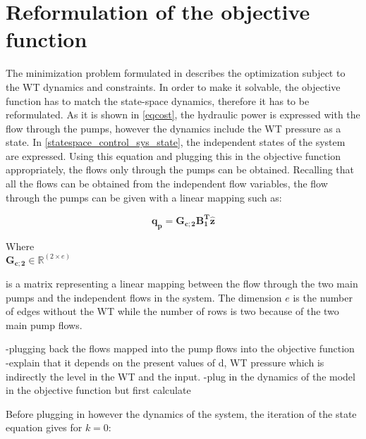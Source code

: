 \section{Reformulation of the objective function}
\label{ObjFunc_reform}

The minimization problem formulated in  describes the optimization subject to the WT dynamics and constraints. In order to make it solvable, the objective function has to match the state-space dynamics, therefore it has to be reformulated. As it is shown in \eqref{eqcost}, the hydraulic power is expressed with the flow through the pumps, however the dynamics include the WT pressure as a state. In \eqref{statespace_control_sys_state}, the independent states of the system are expressed. Using this equation and plugging this in the objective function appropriately, the flows only through the pumps can be obtained. Recalling that all the flows can be obtained from the independent flow variables, the flow through the pumps can be given with a linear mapping such as: 

\begin{equation}
\pmb{q_p}  = \pmb{G_{c;2}} \pmb{B_1^T}  \pmb{\hat{z}}
\label{mapping_mainP}
\end{equation}


\begin{minipage}[t]{0.20\textwidth}
Where\\
\hspace*{8mm} $\pmb{G_{c;2}} \in \pmb{\mathbb{R}}^{(2 \times e)} $ 
\end{minipage}
\begin{minipage}[t]{0.68\textwidth}
\vspace*{2mm}
is a matrix representing a linear mapping between the flow through the two main pumps and the independent flows in the system. The dimension $e$ is the number of edges without the WT while the number of rows is two because of the two main pump flows. 
\end{minipage} 

-plugging back the flows mapped into the pump flows into the objective function
-explain that it depends on the present values of d, WT pressure which is indirectly the level in the WT and the input. 
-plug in the dynamics of the model in the objective function but first calculate 

Before plugging in however the dynamics of the system, the iteration of the state equation gives for $k=0$:

